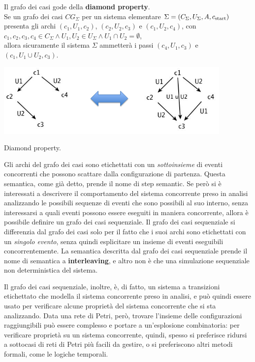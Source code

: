 \begin{property}
    Il grafo dei casi gode della \textbf{diamond property}.\\
    Se un grafo dei casi $CG_{\Sigma}$ per un sistema elementare
    $\Sigma = (C_{\Sigma}, U_{\Sigma}, A, c_{\textnormal{start}})$ presenta gli archi
    $(c_1, U_1, c_2)$, $(c_2, U_2, c_3)$ e $(c_1, U_2, c_4)$, con
    $c_1, c_2, c_3, c_4 \in C_{\Sigma} \land U_1, U_2 \in U_{\Sigma} \land
    U_1 \cap U_2 = \emptyset$,\\
    allora sicuramente il sistema $\Sigma$ ammetterà i passi
    $(c_4, U_1, c_3)$ e $(c_1, U_1 \cup U_2, c_3)$.
    \begin{marginfigure}[1cm]
        \includegraphics[width=1.05\linewidth]{img/diamond_property.png}
        \caption{Diamond property.}
        \label{fig:diamond_property}
    \end{marginfigure}
\end{property}
Gli archi del grafo dei casi sono etichettati
con un \textit{sottoinsieme} di eventi concorrenti che possono scattare dalla
configurazione di partenza. Questa semantica, come già detto, prende il nome di
step semantic.
Se però si è interessati a descrivere il comportamento del sistema concorrente
preso in analisi analizzando le possibili sequenze di eventi
che sono possibili al suo interno, senza interessarsi a quali eventi
possono essere eseguiti in maniera concorrente, allora è possibile definire
un grafo dei casi sequenziale. Il grafo dei casi sequenziale si differenzia
dal grafo dei casi solo per il fatto che i suoi archi sono etichettati con un
\textit{singolo evento}, senza quindi esplicitare un insieme di eventi
eseguibili concorrentemente.
La semantica descritta dal grafo dei casi sequenziale prende il nome
di semantica a \textbf{interleaving}, e altro non è
che una simulazione sequenziale non deterministica del sistema.

Il grafo dei casi sequenziale, inoltre, è, di fatto, un sistema a transizioni
etichettato che modella il sistema concorrente preso in analisi,
e può quindi essere usato per verificare alcune proprietà del sistema
concorrente che si sta analizzando.
Data una rete di Petri, però, trovare l'insieme delle configurazioni raggiungibili
può essere complesso e portare a un'esplosione combinatoria:
per verificare proprietà su un sistema concorrente, quindi, spesso
si preferisce ridursi a sottocasi di reti di Petri più facili da gestire,
o si preferiscono altri metodi formali, come le logiche temporali.

